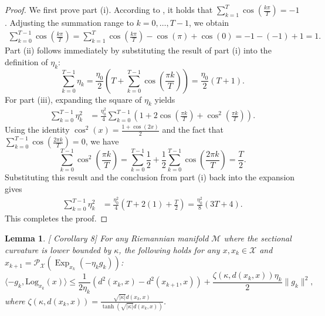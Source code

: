 \documentclass{article}
\newcommand{\Log}{\mathrm{Log}}
\theoremstyle{plain}
\newtheorem{lemma}[theorem]{Lemma}
\theoremstyle{definition}
\theoremstyle{remark}
\begin{document}
\begin{proof}
We first prove part (i). According to \cite{li2021secondlookexponentialcosine}, it holds that $\sum_{k=1}^{T} \cos\left(\frac{k\pi}{T}\right) = -1$. Adjusting the summation range to $k=0, \dots, T-1$, we obtain
\begin{align*}
\sum_{k=0}^{T-1} \cos\left(\frac{k\pi}{T}\right) 
= \sum_{k=1}^{T} \cos\left(\frac{k\pi}{T}\right) - \cos(\pi) + \cos(0) 
= -1 - (-1) + 1 
= 1.
\end{align*}
Part (ii) follows immediately by substituting the result of part (i) into the definition of $\eta_k$:
\[
\sum_{k=0}^{T-1} \eta_k = \frac{\eta_0}{2}\left(T + \sum_{k=0}^{T-1}\cos\left(\frac{\pi k}{T}\right)\right) = \frac{\eta_0}{2}(T+1).
\]
For part (iii), expanding the square of $\eta_k$ yields
\begin{align*}
\sum_{k=0}^{T-1} \eta_k^{2}
&= \frac{\eta_0^{2}}{4}\sum_{k=0}^{T-1}\left(1 + 2\cos\left(\frac{\pi k}{T}\right) + \cos^{2}\left(\frac{\pi k}{T}\right)\right).
\end{align*}
Using the identity $\cos^2(x) = \frac{1+\cos(2x)}{2}$ and the fact that $\sum_{k=0}^{T-1} \cos(\frac{2\pi k}{T}) = 0$, we have
\[
\sum_{k=0}^{T-1} \cos^2\left(\frac{\pi k}{T}\right) = \sum_{k=0}^{T-1} \frac{1}{2} + \frac{1}{2}\sum_{k=0}^{T-1}\cos\left(\frac{2\pi k}{T}\right) = \frac{T}{2}.
\]
Substituting this result and the conclusion from part (i) back into the expansion gives
\begin{align*}
\sum_{k=0}^{T-1} \eta_k^{2}
&= \frac{\eta_0^{2}}{4}\left( T + 2(1) + \frac{T}{2} \right)
= \frac{\eta_0^{2}}{8}(3T+4).
\end{align*}
This completes the proof.
\end{proof}

\begin{lemma}\label{lem:riemannian_cosine_law}[\cite{zhang2016firstordermethodsgeodesicallyconvex} Corollary 8]
For any Riemannian manifold $\mathcal{M}$ where the sectional curvature is lower bounded by $\kappa$, the following holds for any $x, x_k \in \mathcal{X}$ and $x_{k+1} = \mathcal{P}_{\mathcal{X}}(\operatorname{Exp}_{x_k}(-\eta_k g_k))$:
\begin{equation*}
\langle -g_k, \Log_{x_k}(x) \rangle \leq \frac{1}{2\eta_k} (d^2(x_k, x) - d^2(x_{k+1}, x)) + \frac{\zeta(\kappa, d(x_k, x))\eta_k}{2} \|g_k\|^2, 
\end{equation*}
where $\zeta(\kappa, d(x_k, x)) = \frac{\sqrt{|\kappa|} d(x_k, x)}{\tanh(\sqrt{|\kappa|} d(x_k, x))}$.
\end{lemma}
\end{document}
